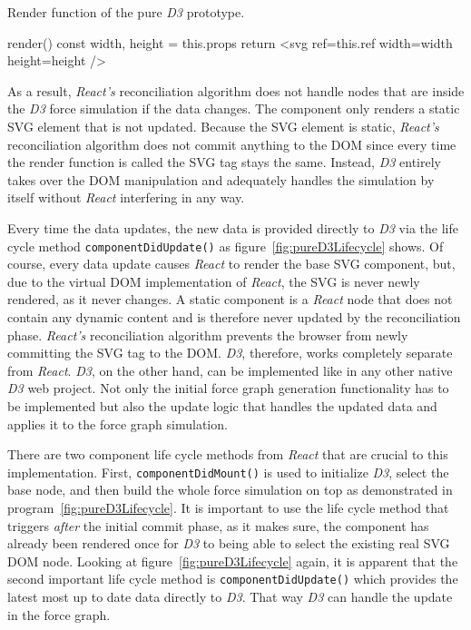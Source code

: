 \begin{program}
\caption{Render function of the pure \emph{D3} prototype.}
\label{prog:pureD3render}
\begin{JsCode}
render() {
  const { width, height } = this.props
  return <svg ref={this.ref} width={width} height={height} />
}
\end{JsCode}
\end{program}

As a result, \emph{React's} reconciliation algorithm does not handle nodes that are inside the \emph{D3} force simulation if the data changes. The component only renders a static SVG element that is not updated. Because the SVG element is static, \emph{React's} reconciliation algorithm does not commit anything to the DOM since every time the render function is called the SVG tag stays the same. Instead, \emph{D3} entirely takes over the DOM manipulation and adequately handles the simulation by itself without \emph{React} interfering in any way.

Every time the data updates, the new data is provided directly to \emph{D3} via the life cycle method \texttt{componentDidUpdate()} as figure~\ref{fig:pureD3Lifecycle} shows. Of course, every data update causes \emph{React} to render the base SVG component, but, due to the virtual DOM implementation of \emph{React}, the SVG is never newly rendered, as it never changes. A static component is a \emph{React} node that does not contain any dynamic content and is therefore never updated by the reconciliation phase. \emph{React's} reconciliation algorithm prevents the browser from newly committing the SVG tag to the DOM. \emph{D3}, therefore, works completely separate from \emph{React}. \emph{D3}, on the other hand, can be implemented like in any other native \emph{D3} web project. Not only the initial force graph generation functionality has to be implemented but also the update logic that handles the updated data and applies it to the force graph simulation.

There are two component life cycle methods from \emph{React} that are crucial to this implementation. First, \texttt{componentDidMount()} is used to initialize \emph{D3}, select the base node, and then build the whole force simulation on top as demonstrated in program~\ref{fig:pureD3Lifecycle}. It is important to use the life cycle method that triggers \emph{after} the initial commit phase, as it makes sure, the component has already been rendered once for \emph{D3} to being able to select the existing real SVG DOM node. Looking at figure~\ref{fig:pureD3Lifecycle} again, it is apparent that the second important life cycle method is \texttt{componentDidUpdate()} which provides the latest most up to date data directly to \emph{D3}. That way \emph{D3} can handle the update in the force graph.

